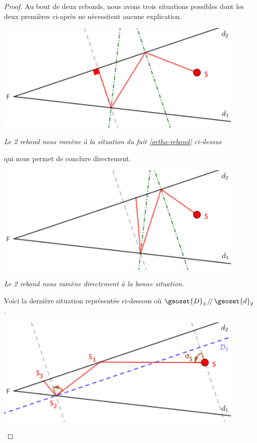 \begin{proof}
	Au bout de deux rebonds, nous avons trois situations possibles dont les deux premières ci-après ne nécessitent aucune explication.
	
	
	\medskip
	
	\begin{center}
		\includegraphics[width=12cm]{basic-math-pool/proof-starting-with-d2-2-bounces-to-ortho.png}

		\itshape\small
		Le 2\ieme{} rebond nous ramène à la situation du fait \ref{ortho-rebond} ci-dessus
		
		qui nous permet de conclure directement.
	\end{center}
	
	
	\medskip
	
	\begin{center}
		\includegraphics[width=12cm]{basic-math-pool/proof-starting-with-d2-2-bounces-to-infinity.png}

		\itshape\small
		Le 2\ieme{} rebond nous ramène directement à la bonne situation.
	\end{center}
	
	
	\medskip
	
	Voici la dernière situation représentée ci-dessous où $\geoset{D}_2 \, /\!/ \, \geoset{d}_2$.
	
	
	\medskip
	
	\begin{center}
		\includegraphics[width=12cm]{basic-math-pool/proof-starting-with-d2-2-bounces-to-F.png}


\end{center}
\end{proof}
